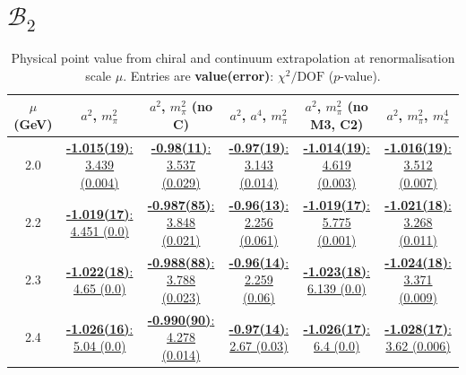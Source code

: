 \documentclass[12pt]{extarticle}
\begin{document}
\section{$\mathcal{B}_2$}
\begin{table}[h!]
\begin{center}
\begin{tabular}{|c|c|c|c|c|c|}
\hline
$\mu$ (GeV) & $a^2$, $m_\pi^2$& $a^2$, $m_\pi^2$ (no C)& $a^2$, $a^4$, $m_\pi^2$& $a^2$, $m_\pi^2$ (no M3, C2)& $a^2$, $m_\pi^2$, $m_\pi^4$\\
\hline
2.0& \hyperlink{VVmAA/NPR/a2m2_20.pdf.1}{\textbf{-1.015(19)}: 3.439 (0.004)} & \hyperlink{VVmAA/NPR/a2m2noC_20.pdf.1}{\textbf{-0.98(11)}: 3.537 (0.029)} & \hyperlink{VVmAA/NPR/a2a4m2_20.pdf.1}{\textbf{-0.97(19)}: 3.143 (0.014)} & \hyperlink{VVmAA/NPR/a2m2mcut_20.pdf.1}{\textbf{-1.014(19)}: 4.619 (0.003)} & \hyperlink{VVmAA/NPR/a2m2m4_20.pdf.1}{\textbf{-1.016(19)}: 3.512 (0.007)}\\
2.2& \hyperlink{VVmAA/NPR/a2m2_22.pdf.1}{\textbf{-1.019(17)}: 4.451 (0.0)} & \hyperlink{VVmAA/NPR/a2m2noC_22.pdf.1}{\textbf{-0.987(85)}: 3.848 (0.021)} & \hyperlink{VVmAA/NPR/a2a4m2_22.pdf.1}{\textbf{-0.96(13)}: 2.256 (0.061)} & \hyperlink{VVmAA/NPR/a2m2mcut_22.pdf.1}{\textbf{-1.019(17)}: 5.775 (0.001)} & \hyperlink{VVmAA/NPR/a2m2m4_22.pdf.1}{\textbf{-1.021(18)}: 3.268 (0.011)}\\
2.3& \hyperlink{VVmAA/NPR/a2m2_23.pdf.1}{\textbf{-1.022(18)}: 4.65 (0.0)} & \hyperlink{VVmAA/NPR/a2m2noC_23.pdf.1}{\textbf{-0.988(88)}: 3.788 (0.023)} & \hyperlink{VVmAA/NPR/a2a4m2_23.pdf.1}{\textbf{-0.96(14)}: 2.259 (0.06)} & \hyperlink{VVmAA/NPR/a2m2mcut_23.pdf.1}{\textbf{-1.023(18)}: 6.139 (0.0)} & \hyperlink{VVmAA/NPR/a2m2m4_23.pdf.1}{\textbf{-1.024(18)}: 3.371 (0.009)}\\
2.4& \hyperlink{VVmAA/NPR/a2m2_24.pdf.1}{\textbf{-1.026(16)}: 5.04 (0.0)} & \hyperlink{VVmAA/NPR/a2m2noC_24.pdf.1}{\textbf{-0.990(90)}: 4.278 (0.014)} & \hyperlink{VVmAA/NPR/a2a4m2_24.pdf.1}{\textbf{-0.97(14)}: 2.67 (0.03)} & \hyperlink{VVmAA/NPR/a2m2mcut_24.pdf.1}{\textbf{-1.026(17)}: 6.4 (0.0)} & \hyperlink{VVmAA/NPR/a2m2m4_24.pdf.1}{\textbf{-1.028(17)}: 3.62 (0.006)}\\
\hline
\end{tabular}
\caption{Physical point value from chiral and continuum extrapolation at renormalisation scale $\mu$. Entries are \textbf{value(error)}: $\chi^2/\text{DOF}$ ($p$-value).}
\end{center}
\end{table}
\end{document}
